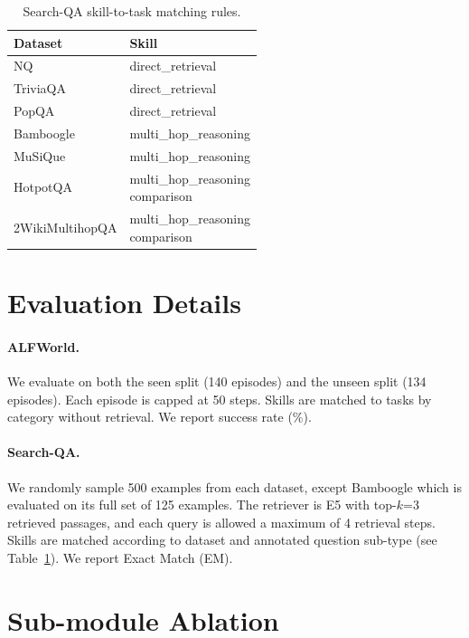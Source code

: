 \documentclass{llmxive}
\providecommand{\arraystretch}{1.05}
\begin{document}
\begin{table}[!htbp]
\centering
\small
\setlength{\tabcolsep}{5pt}
\renewcommand{\arraystretch}{1.1}
\begin{tabular}{ll}
\toprule
\textbf{Dataset} & \textbf{Skill} \\
\midrule
NQ & direct\_retrieval \\
TriviaQA & direct\_retrieval \\
PopQA & direct\_retrieval \\
\midrule
Bamboogle & multi\_hop\_reasoning \\
MuSiQue & multi\_hop\_reasoning \\
\midrule
HotpotQA & \makecell[l]{multi\_hop\_reasoning \\ comparison} \\
2WikiMultihopQA & \makecell[l]{multi\_hop\_reasoning \\ comparison} \\
\bottomrule
\end{tabular}
\caption{Search-QA skill-to-task matching rules.}
\label{tab:skill_search}
\end{table}

\section{Evaluation Details}
\label{app:eval}

\paragraph{ALFWorld.} We evaluate on both the seen split (140 episodes) and the unseen split (134 episodes). Each episode is capped at 50 steps. Skills are matched to tasks by category without retrieval. We report success rate (\%).

\paragraph{Search-QA.} We randomly sample 500 examples from each dataset, except Bamboogle which is evaluated on its full set of 125 examples. The retriever is E5 with top-$k$=3 retrieved passages, and each query is allowed a maximum of 4 retrieval steps. Skills are matched according to dataset and annotated question sub-type (see Table~\ref{tab:skill_search}). We report Exact Match (EM).

\section{Sub-module Ablation}
\label{app:submodule}
\end{document}
